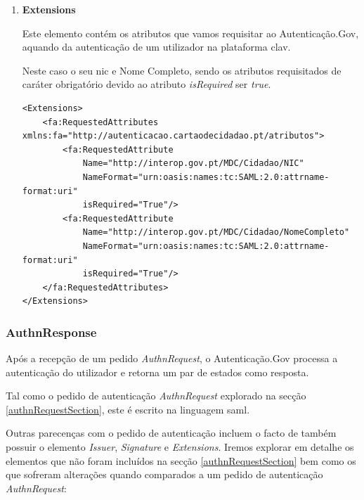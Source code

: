 \begin{enumerate}
    \vspace{-13mm}
    \item \textbf{Extensions}
    
    Este elemento contém os atributos que vamos requisitar ao Autenticação.Gov, aquando da autenticação de um utilizador na plataforma \gls{clav}. 
    
    Neste caso o seu \gls{nic} e Nome Completo, sendo os atributos requisitados de caráter obrigatório devido ao atributo \emph{isRequired} ser \emph{true}.
    
    \vspace{-2mm}
    \begin{lstlisting}
<Extensions>
    <fa:RequestedAttributes xmlns:fa="http://autenticacao.cartaodecidadao.pt/atributos">
        <fa:RequestedAttribute 
            Name="http://interop.gov.pt/MDC/Cidadao/NIC" 
            NameFormat="urn:oasis:names:tc:SAML:2.0:attrname-format:uri" 
            isRequired="True"/>
        <fa:RequestedAttribute
            Name="http://interop.gov.pt/MDC/Cidadao/NomeCompleto" 
            NameFormat="urn:oasis:names:tc:SAML:2.0:attrname-format:uri" 
            isRequired="True"/>
    </fa:RequestedAttributes>
</Extensions>
    \end{lstlisting}
\end{enumerate}

\subsubsection{AuthnResponse}

Após a recepção de um pedido \emph{AuthnRequest}, o Autenticação.Gov processa a autenticação do utilizador e retorna um par de estados como resposta.

Tal como o pedido de autenticação \emph{AuthnRequest} explorado na secção \ref{authnRequestSection}, este é escrito na linguagem \gls{saml}.

Outras parecenças com o pedido de autenticação incluem o facto de também possuir o elemento \emph{Issuer}, \emph{Signature} e \emph{Extensions}. Iremos explorar em detalhe os elementos que não foram incluídos na secção \ref{authnRequestSection} bem como os que sofreram alterações quando comparados a um pedido de autenticação \emph{AuthnRequest}:

